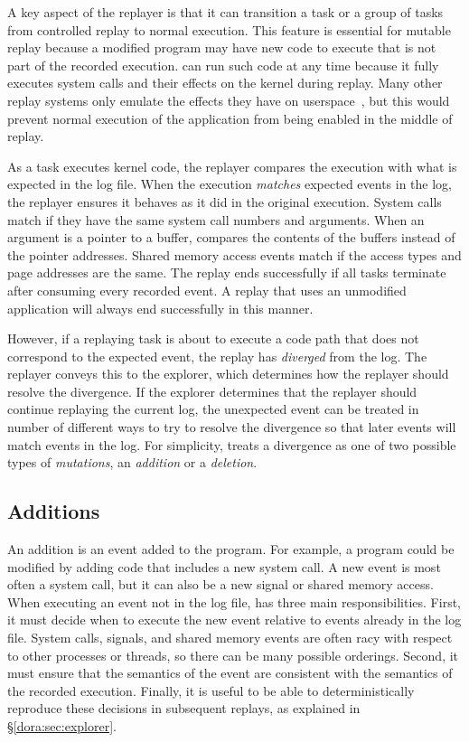 A key aspect of the replayer is that it can
transition a task or a group of tasks from controlled replay to normal
execution. This feature is essential for mutable replay because a
modified program may have new code to execute that is not
part of the recorded execution.
{\dora} can run such code at any time because it
fully executes system calls and their effects on the kernel during
replay. Many other replay systems only emulate the effects they have
on userspace~\cite{jockey,r2:osdi}, but this would prevent normal
execution of the application from being enabled in the middle of
replay.

As a task executes kernel code, the replayer compares the execution
with what is expected in the log file.  When the execution
\emph{matches} expected events in the log, the 
replayer ensures it behaves as it did in the original execution.  
System calls match if they have the same system call numbers and
arguments. When an argument is a pointer to a buffer, {\dora}
compares the contents of the buffers instead of the pointer addresses.
Shared memory access events match if the access types and page
addresses are the same.  The replay ends successfully if all tasks
terminate after consuming every recorded event. A replay that uses an
unmodified application will always end successfully in this manner.

However, if a replaying task is about to execute a code path that does
not correspond to the expected event, the replay has \emph{diverged}
from the log.  The replayer conveys this to the explorer, which
determines how the replayer should resolve the divergence.
If the explorer determines that the replayer should continue
replaying the current log, the unexpected event can be treated in
number of different ways to try to resolve the divergence so that
later events will match events in the log.  For simplicity, {\dora}
treats a divergence as one of two possible types of \emph{mutations},
an \emph{addition} or a \emph{deletion}.  

\subsection{Additions}
An addition is an event added to the program.  For example, a program
could be modified by adding code that includes a new system call.  A
new event is most often a system call, but it can also be a new signal
or shared memory access.  When executing an event not in the log file,
{\dora} has three main responsibilities.  First, it must decide when
to execute the new event relative to events already in the log
file. System calls, signals, and shared memory events are often racy
with respect to other processes or threads, so there can be many
possible orderings.  Second, it must ensure that the semantics of the
event are consistent with the semantics of the recorded execution.
Finally, it is useful to be able to deterministically reproduce these
decisions in subsequent replays, as explained in
\S\ref{dora:sec:explorer}. 

